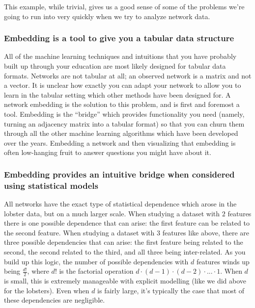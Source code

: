 This example, while trivial, gives us a good sense of some of the problems we're going to run into very quickly when we try to analyze network data. 

\subsubsection*{Embedding is a tool to give you a tabular data structure}

All of the machine learning techniques and intuitions that you have probably built up through your education are most likely designed for tabular data formats. Networks are not tabular at all; an observed network is a matrix and not a vector. It is unclear how exactly you can adapt your network to allow you to learn in the tabular setting which other methods have been designed for. A network embedding is the solution to this problem, and is first and foremost a tool. Embedding is the ``bridge'' which provides functionality you need (namely, turning an adjacency matrix into a tabular format) so that you can churn them through all the other machine learning algorithms which have been developed over the years. Embedding a network and then visualizing that embedding is often low-hanging fruit to answer questions you might have about it. 

\subsubsection*{Embedding provides an intuitive bridge when considered using statistical models}

All networks have the exact type of statistical dependence which arose in the lobster data, but on a much larger scale. When studying a dataset with $2$ features there is one possible dependence that can arise: the first feature can be related to the second feature. When studying a dataset with $3$ features like above, there are three possible dependencies that can arise: the first feature being related to the second, the second related to the third, and all three being inter-related. As you build up this logic, the number of possible dependencies with $d$ features winds up being $\frac{d!}{2}$, where $d!$ is the factorial operation $d\cdot (d - 1) \cdot (d - 2) \cdot ... \cdot 1$. When $d$ is small, this is extremely manageable with explicit modelling (like we did above for the lobsters). Even when $d$ is fairly large, it's typically the case that most of these dependencies are negligible.

